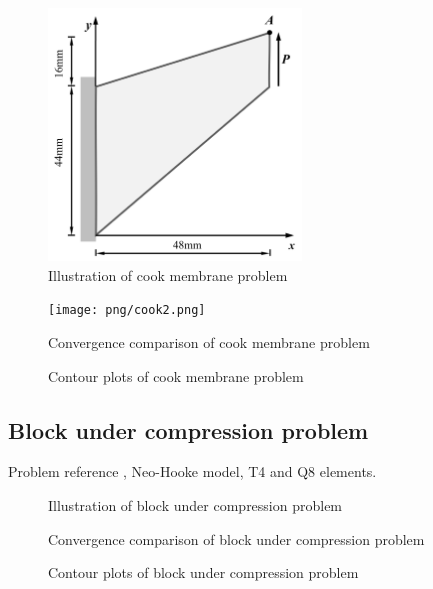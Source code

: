 \begin{figure}[!ht]
\centering
\includegraphics[width=0.6\textwidth]{png/cook.png}
\caption{Illustration of cook membrane problem}\label{cook_illsutration}
\end{figure}

\begin{figure}[!ht]
\centering
\texttt{[image: png/cook2.png]}
\caption{Convergence comparison of cook membrane problem}\label{cook_convergence}
\end{figure}

\begin{figure}[!ht]
\centering
\caption{Contour plots of cook membrane problem}\label{cook_contour}
\end{figure}

\subsection{Block under compression problem}
Problem reference \cite{reese2000}, Neo-Hooke model, T4 and Q8 elements.

\begin{figure}[!ht]
\centering
\caption{Illustration of block under compression problem}\label{block_illsutration}
\end{figure}

\begin{figure}[!ht]
\centering
\caption{Convergence comparison of block under compression problem}\label{block_convergence}
\end{figure}

\begin{figure}[!ht]
\centering
\caption{Contour plots of block under compression problem}\label{block_contour}
\end{figure}
